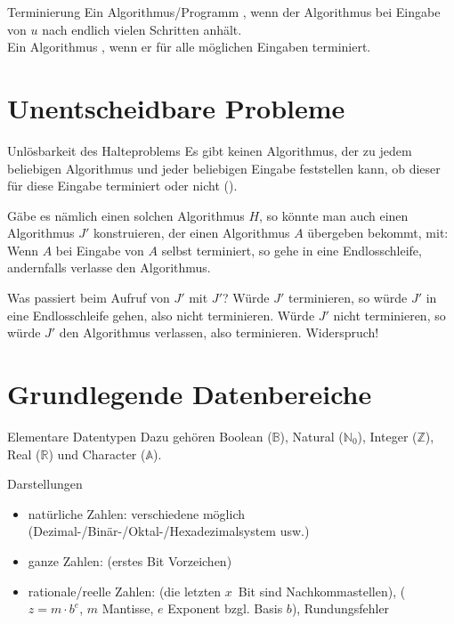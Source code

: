 \begin{Def}{Terminierung}
    Ein Algorithmus/Programm ,
    wenn der Algorithmus bei Eingabe von $u$ nach endlich vielen Schritten
    anhält. \\
    Ein Algorithmus , wenn er für alle möglichen
    Eingaben terminiert.
\end{Def}

\section{%
    Unentscheidbare Probleme%
}

\begin{Satz}{Unlösbarkeit des Halteproblems}
    Es gibt keinen Algorithmus, der zu jedem beliebigen Algorithmus und jeder
    beliebigen Eingabe feststellen kann, ob dieser für diese Eingabe terminiert
    oder nicht ().

    Gäbe es nämlich einen solchen Algorithmus $H$, so könnte man auch einen
    Algorithmus $J'$ konstruieren, der einen Algorithmus $A$ übergeben bekommt,
    mit:
    Wenn $A$ bei Eingabe von $A$ selbst terminiert, so gehe in eine
    Endlosschleife, andernfalls verlasse den Algorithmus.

    Was passiert beim Aufruf von $J'$ mit $J'$? Würde $J'$ terminieren, so
    würde $J'$ in eine Endlosschleife gehen, also nicht terminieren.
    Würde $J'$  nicht terminieren, so würde $J'$ den Algorithmus verlassen,
    also terminieren.
    Widerspruch!
\end{Satz}

\pagebreak

\section{%
    Grundlegende Datenbereiche%
}

\begin{Def}{Elementare Datentypen}
    Dazu gehören Boolean ($\mathbb{B}$), Natural ($\mathbb{N}_0$),
    Integer ($\mathbb{Z}$), Real ($\mathbb{R}$) und Character ($\mathbb{A}$).
\end{Def}

\begin{Def}{Darstellungen}
    \begin{itemize}
        \item natürliche Zahlen: verschiedene 
        möglich \\
        (Dezimal-/Binär-/Oktal-/Hexadezimalsystem usw.)

        \item ganze Zahlen: 
        (erstes Bit Vorzeichen)

        \item rationale/reelle Zahlen: 
        (die letzten $x$~Bit sind Nachkommastellen),
        ($z = m \cdot b^e$, $m$ Mantisse, $e$ Exponent bzgl. Basis $b$),
        Rundungsfehler
    \end{itemize}
\end{Def}

